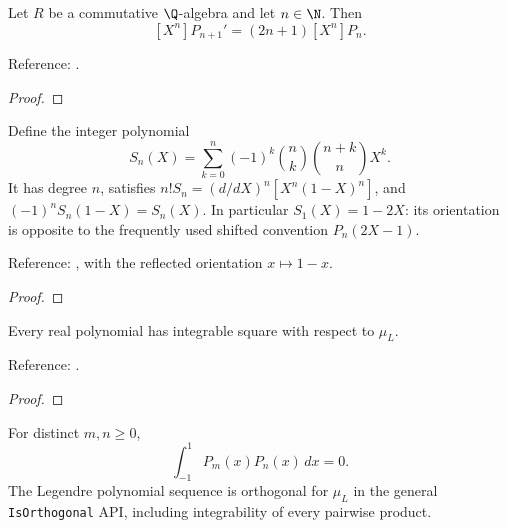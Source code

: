 \begin{supporting}
\begin{theorem}
\label{thm:legendre-derivative-leading-coefficient}
\leanok
Let $R$ be a commutative $\Q$-algebra and let $n\in\N$. Then
\[ [X^n]P_{n+1}'=(2n+1)[X^n]P_n. \]

Reference: \cite[18.3 and 18.9]{dlmf}.
\end{theorem}
\begin{proof}
\leanok
\end{proof}

\begin{theorem}
\label{thm:shifted-legendre}
\mathlibok
Define the integer polynomial
\[S_n(X)=\sum_{k=0}^n(-1)^k\binom nk\binom{n+k}{n}X^k.\]
It has degree $n$, satisfies $n!S_n=(d/dX)^n[X^n(1-X)^n]$, and
$(-1)^nS_n(1-X)=S_n(X)$. In particular $S_1(X)=1-2X$: its orientation is
opposite to the frequently used shifted convention $P_n(2X-1)$.

Reference: \cite[18.7.10]{dlmf}, with the reflected orientation $x\mapsto1-x$.
\end{theorem}
\begin{proof}
\mathlibok
\end{proof}

\begin{theorem}
\label{thm:legendre-moments}
\leanok
Every real polynomial has integrable square with respect to $\mu_L$.

Reference: \cite[Table 18.3.1]{dlmf}.
\end{theorem}
\begin{proof}
\leanok
\end{proof}

\begin{theorem}
\label{thm:legendre-orthogonal}
\leanok
For distinct $m,n\ge0$,
\[\int_{-1}^{1}P_m(x)P_n(x)\,dx=0.\]
The Legendre polynomial sequence is orthogonal for $\mu_L$ in the general
\texttt{IsOrthogonal} API, including integrability of every pairwise product.


\end{theorem}
\end{supporting}
